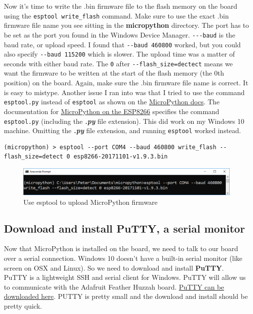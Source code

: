 \documentclass{book}
\makeatletter
\def\maxwidth{\ifdim\Gin@nat@width>\linewidth\linewidth
    \else\Gin@nat@width\fi}
\let\Oldincludegraphics\includegraphics
\renewcommand{\includegraphics}[1]{\Oldincludegraphics[width=.8\maxwidth]{#1}}
\makeatother
\begin{document}
Now it's time to write the .bin firmware file to the flash memory on the
board using the \lstinline!esptool write_flash! command. Make sure to
use the exact .bin firmware file name you see sitting in the
\textbf{micropython} directory. The port has to be set as the port you
found in the Windows Device Manager. \lstinline!---baud! is the baud
rate, or upload speed. I found that \lstinline!--baud 460800! worked,
but you could also specify \lstinline!--baud 115200! which is slower.
The upload time was a matter of seconds with either baud rate. The
\lstinline!0! after \lstinline!--flash_size=dectect! means we want the
firmware to be written at the start of the flash memory (the 0th
position) on the board. Again, make sure the .bin firmware file name is
correct. It is easy to mistype. Another issue I ran into was that I
tried to use the command \lstinline!esptool.py! instead of
\lstinline!esptool! as shown on the
\href{https://docs.micropython.org/en/latest/esp8266/esp8266/tutorial/intro.html\#deploying-the-firmware}{MicroPython
docs}. The documentation for
\href{https://docs.micropython.org/en/latest/esp8266/esp8266/tutorial/intro.html\#deploying-the-firmware}{MicroPython
on the ESP8266} specifies the command \lstinline!esptool.py! (including
the \textbf{\emph{.py}} file extension). This did work on my Windows 10
machine. Omitting the \textbf{\emph{.py}} file extension, and running
\lstinline!esptool! worked instead.

\begin{lstlisting}
(micropython) > esptool --port COM4 --baud 460800 write_flash --flash_size=detect 0 esp8266-20171101-v1.9.3.bin
\end{lstlisting}

\begin{figure}
\centering
\includegraphics{images/esptool_write_flash.PNG}
\caption{Use esptool to upload MicroPython firmware}
\end{figure}

    \subsection{Download and install PuTTY, a serial
monitor}\label{download-and-install-putty-a-serial-monitor}

    Now that MicroPython is installed on the board, we need to talk to our
board over a serial connection. Windows 10 doesn't have a built-in
serial monitor (like screen on OSX and Linux). So we need to download
and install \textbf{PuTTY}. PuTTY is a lightweight SSH and serial client
for Windows. PuTTY will allow us to communicate with the Adafruit
Feather Huzzah board. \href{https://www.putty.org/}{PuTTY can be
downloaded here}. PUTTY is pretty small and the download and install
should be pretty quick.
\end{document}
